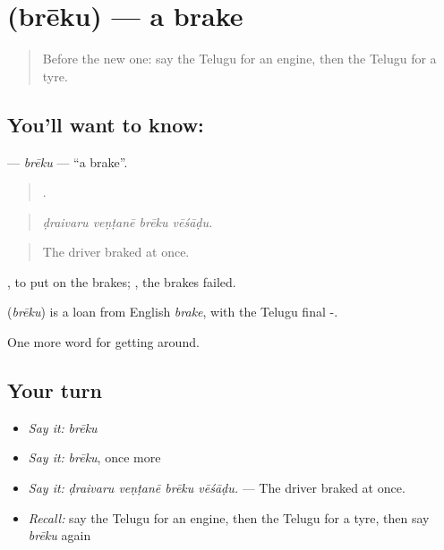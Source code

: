 \section[\texorpdfstring{\te{బ్రేకు} (brēku)}{బ్రేకు (brēku)}]{ (brēku) — a brake}

\label{lesson:TE-C443-breku}



\begin{quote}
Before the new one: say the Telugu for an engine, then the Telugu for a tyre.
\end{quote}

\subsection*{You'll want to know: }
\textbf{} — \emph{brēku} — \textquotedblleft{}a brake\textquotedblright{}.

\begin{quote}
   .
\end{quote}

\begin{quote}
\emph{ḍraivaru veṇṭanē brēku vēśāḍu.}
\end{quote}

\begin{quote}
The driver braked at once.
\end{quote}

 , to put on the brakes;  , the brakes failed.

\begin{cousinweb}
\textbf{} (\emph{brēku}) is a loan from English \emph{brake}, with the Telugu final -.
\end{cousinweb}

\begin{grammarlens}[title={What you've built}]
One more word for getting around.
\end{grammarlens}

\subsection*{Your turn}
\begin{itemize}
\raggedright
  \item \emph{Say it:} \emph{brēku}
  \item \emph{Say it:} \emph{brēku}, once more
  \item \emph{Say it:} \emph{ḍraivaru veṇṭanē brēku vēśāḍu.} — The driver braked at once.
  \item \emph{Recall:} say the Telugu for an engine, then the Telugu for a tyre, then say \emph{brēku} again
\end{itemize}

